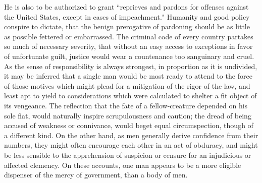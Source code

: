 He is also to be authorized to grant ``reprieves and pardons for offenses against the United States, except in cases of impeachment." Humanity and good policy conspire to dictate, that the benign prerogative of pardoning should be as little as possible fettered or embarrassed. 
The criminal code of every country partakes so much of necessary severity, that without an easy access to exceptions in favor of unfortunate guilt, justice would wear a countenance too sanguinary and cruel. 
As the sense of responsibility is always strongest, in proportion as it is undivided, it may be inferred that a single man would be most ready to attend to the force of those motives which might plead for a mitigation of the rigor of the law, and least apt to yield to considerations which were calculated to shelter a fit object of its vengeance. 
The reflection that the fate of a fellow-creature depended on his sole fiat, would naturally inspire scrupulousness and caution; the dread of being accused of weakness or connivance, would beget equal circumspection, though of a different kind. 
On the other hand, as men generally derive confidence from their numbers, they might often encourage each other in an act of obduracy, and might be less sensible to the apprehension of suspicion or censure for an injudicious or affected clemency. 
On these accounts, one man appears to be a more eligible dispenser of the mercy of government, than a body of men.

